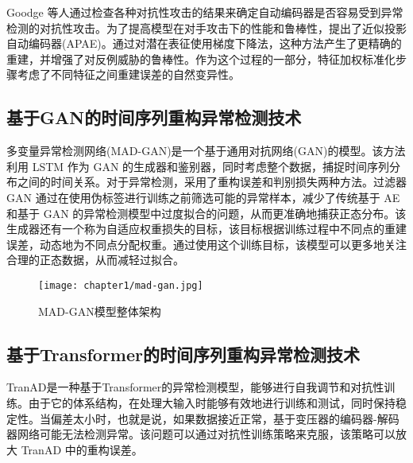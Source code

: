 Goodge 等人\cite{apae}通过检查各种对抗性攻击的结果来确定自动编码器是否容易受到异常检测的对抗性攻击。为了提高模型在对手攻击下的性能和鲁棒性，提出了近似投影自动编码器(APAE)。通过对潜在表征使用梯度下降法，这种方法产生了更精确的重建，并增强了对反例威胁的鲁棒性。作为这个过程的一部分，特征加权标准化步骤考虑了不同特征之间重建误差的自然变异性。

\subsection{基于GAN的时间序列重构异常检测技术}
多变量异常检测网络(MAD-GAN)\cite{gan}是一个基于通用对抗网络(GAN)的模型。该方法利用 LSTM 作为 GAN 的生成器和鉴别器，同时考虑整个数据，捕捉时间序列分布之间的时间关系。对于异常检测，采用了重构误差和判别损失两种方法。过滤器 GAN 通过在使用伪标签进行训练之前筛选可能的异常样本，减少了传统基于 AE 和基于 GAN 的异常检测模型中过度拟合的问题，从而更准确地捕获正态分布。该生成器还有一个称为自适应权重损失的目标，该目标根据训练过程中不同点的重建误差，动态地为不同点分配权重。通过使用这个训练目标，该模型可以更多地关注合理的正态数据，从而减轻过拟合。
\begin{figure}[htbp]
    \centering
    \texttt{[image: chapter1/mad-gan.jpg]}
    \caption{MAD-GAN模型整体架构\cite{mad-gan}}
    \end{figure}

\subsection{基于Transformer的时间序列重构异常检测技术}
TranAD\cite{tranad}是一种基于Transformer的异常检测模型，能够进行自我调节和对抗性训练。由于它的体系结构，在处理大输入时能够有效地进行训练和测试，同时保持稳定性。当偏差太小时，也就是说，如果数据接近正常，基于变压器的编码器-解码器网络可能无法检测异常。该问题可以通过对抗性训练策略来克服，该策略可以放大 TranAD 中的重构误差。

